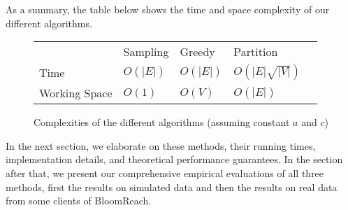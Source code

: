 As a summary, the table below shows the time and space complexity
of our different algorithms.

\begin{figure}[H]
\centering
\begin{tabular}{l|l|l|l|l}
\cline{2-4}
                                    & Sampling                                        & Greedy   & Partition          &  \\ \cline{1-4}
\multicolumn{1}{|l|}{Time}          & $O(|E|)$                                        & $O(|E|)$ & $O(|E|\sqrt{|V|})$ &  \\ \cline{1-4}
\multicolumn{1}{|l|}{Working Space} & $O(1)$                                          & $O(V)$   & $O(|E|)$           &  \\ \cline{1-4}
\end{tabular}
\caption{Complexities of the different algorithms (assuming constant $a$ and $c$)}
\end{figure}

In the next section, we elaborate on these methods, their running
times, implementation details, and theoretical performance
guarantees. In the section after that, we present our comprehensive
empirical evaluations of all three methods, first the results on
simulated data and then the results on real data from some clients of
BloomReach. 